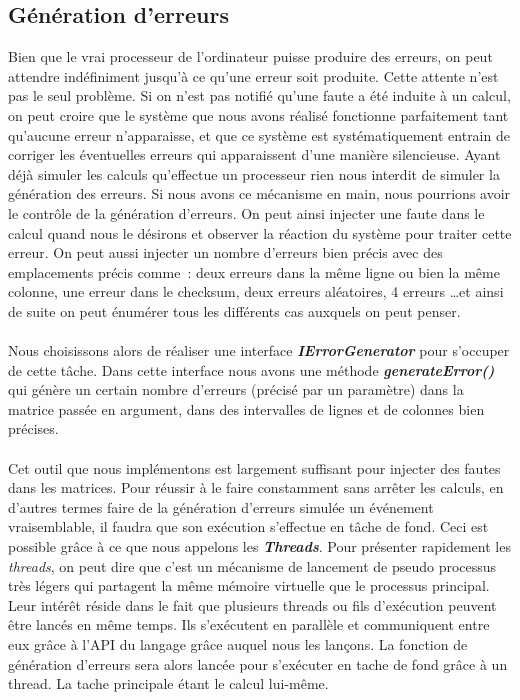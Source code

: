 \documentclass[a4paper,10pt]{report}
\begin{document}
\subsection{Génération d'erreurs}
Bien que le vrai processeur de l’ordinateur puisse produire des erreurs, on peut attendre indéfiniment jusqu'à ce 
qu’une erreur soit produite. Cette attente n’est pas le seul problème. Si on n’est pas notifié qu’une faute a été 
induite à un calcul, on peut croire que le système que nous avons réalisé fonctionne parfaitement tant qu’aucune 
erreur n’apparaisse, et que ce système est systématiquement entrain de corriger les éventuelles erreurs qui apparaissent 
d’une manière silencieuse. Ayant déjà simuler les calculs qu’effectue un processeur rien nous interdit de simuler la 
génération des erreurs. Si nous avons ce mécanisme en main, nous pourrions avoir le contrôle de la génération d’erreurs. 
On peut ainsi injecter une faute dans le calcul quand nous le désirons et observer la réaction du système pour traiter 
cette erreur. On peut aussi injecter un nombre d’erreurs bien précis avec des emplacements précis comme : deux erreurs 
dans la même ligne ou bien la même colonne, une erreur dans le checksum, deux erreurs aléatoires, 4 erreurs \ldots et ainsi 
de suite on peut énumérer tous les différents cas auxquels on peut penser.
\paragraph*{}
Nous choisissons alors de réaliser une interface \textbf{\textit{IErrorGenerator}} pour s’occuper de cette tâche. 
Dans cette interface nous avons une méthode \textbf{\textit{generateError()}} qui génère un certain nombre d’erreurs 
(précisé par un paramètre) dans la matrice passée en argument, dans des intervalles de lignes et de colonnes bien précises.
\paragraph*{}
Cet outil que nous implémentons est largement suffisant pour injecter des fautes dans les matrices. Pour réussir à le 
faire constamment sans arrêter les calculs, en d’autres termes faire de la génération d’erreurs simulée un événement 
vraisemblable, il faudra que son exécution s’effectue en tâche de fond.
\newline
Ceci est possible grâce à ce que nous appelons les \textbf{\textit{Threads}}. Pour présenter rapidement les \textit{threads}, 
on peut dire que c’est un mécanisme de lancement de pseudo processus très légers qui partagent la même mémoire virtuelle que 
le processus principal. Leur intérêt réside dans le fait que plusieurs threads ou fils d’exécution peuvent être lancés en 
même temps. Ils s’exécutent en parallèle et communiquent entre eux grâce à l’API du langage grâce auquel nous les lançons.
La fonction de génération d’erreurs sera alors lancée pour s’exécuter en tache de fond grâce à un thread. La tache principale 
étant le calcul lui-même.
\end{document}
